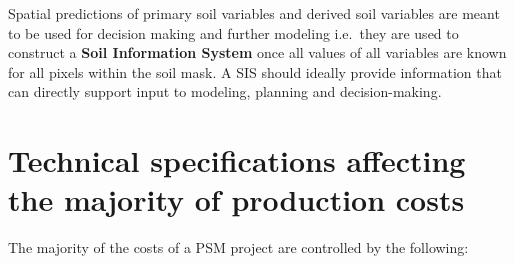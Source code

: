 \documentclass[graybox,natbib,nospthms,UStrade]{svmono}
\begin{document}
Spatial predictions of primary soil variables and derived soil variables
are meant to be used for decision making and further modeling i.e.~they are used to
construct a \textbf{Soil Information System} once all values of all variables
are known for all pixels within the soil mask. A SIS should ideally
provide information that can directly support input to modeling,
planning and decision-making.

\hypertarget{technical-specifications-affecting-the-majority-of-production-costs}{%
\section{Technical specifications affecting the majority of production costs}\label{technical-specifications-affecting-the-majority-of-production-costs}}

The majority of the costs of a PSM project are controlled by the following:
\end{document}
